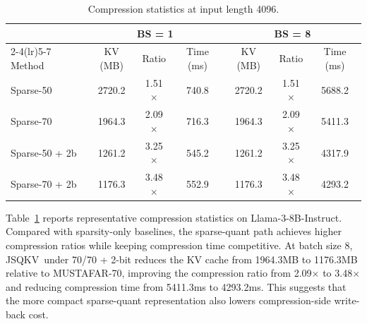 \documentclass[runningheads]{llncs}
\newcommand{\method}{JSQKV}
\begin{document}
\begin{table}[tbp]
\centering
\scriptsize
\renewcommand{\arraystretch}{0.94}
\caption{Compression statistics at input length 4096.}
\label{tab:compression-summary}
\setlength{\tabcolsep}{3.2pt}
\begin{tabular*}{0.96\textwidth}{@{\extracolsep{\fill}}lcccccc@{}}
\toprule
& \multicolumn{3}{c}{BS = 1} & \multicolumn{3}{c}{BS = 8} \\
\cmidrule(lr){2-4}\cmidrule(lr){5-7}
Method & KV (MB) & Ratio & Time (ms) & KV (MB) & Ratio & Time (ms) \\
\midrule
Sparse-50 & 2720.2 & 1.51$\times$ & 740.8 & 2720.2 & 1.51$\times$ & 5688.2 \\
Sparse-70 & 1964.3 & 2.09$\times$ & 716.3 & 1964.3 & 2.09$\times$ & 5411.3 \\
Sparse-50 + 2b & 1261.2 & 3.25$\times$ & 545.2 & 1261.2 & 3.25$\times$ & 4317.9 \\
Sparse-70 + 2b & 1176.3 & 3.48$\times$ & 552.9 & 1176.3 & 3.48$\times$ & 4293.2 \\
\bottomrule
\end{tabular*}
\end{table}

Table~\ref{tab:compression-summary} reports representative compression statistics on Llama-3-8B-Instruct. Compared with sparsity-only baselines, the sparse-quant path achieves higher compression ratios while keeping compression time competitive. At batch size 8, \method\ under 70/70 + 2-bit reduces the KV cache from 1964.3MB to 1176.3MB relative to MUSTAFAR-70, improving the compression ratio from 2.09$\times$ to 3.48$\times$ and reducing compression time from 5411.3ms to 4293.2ms. This suggests that the more compact sparse-quant representation also lowers compression-side write-back cost.



\end{document}

